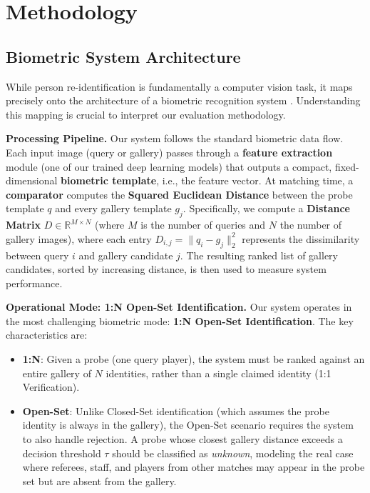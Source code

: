 \documentclass[10pt,twocolumn,letterpaper]{article}
\begin{document}
\section{Methodology}

\subsection{Biometric System Architecture}

While person re-identification is fundamentally a computer vision task, it maps precisely onto the architecture of a biometric recognition system \cite{jain2004introduction}. Understanding this mapping is crucial to interpret our evaluation methodology.

\textbf{Processing Pipeline.} Our system follows the standard biometric data flow. Each input image (query or gallery) passes through a \textbf{feature extraction} module (one of our trained deep learning models) that outputs a compact, fixed-dimensional \textbf{biometric template}, i.e., the feature vector. At matching time, a \textbf{comparator} computes the \textbf{Squared Euclidean Distance} between the probe template $q$ and every gallery template $g_j$. Specifically, we compute a \textbf{Distance Matrix} $D \in \mathbb{R}^{M \times N}$ (where $M$ is the number of queries and $N$ the number of gallery images), where each entry $D_{i,j} = \|q_i - g_j\|_2^2$ represents the dissimilarity between query $i$ and gallery candidate $j$. The resulting ranked list of gallery candidates, sorted by increasing distance, is then used to measure system performance.

\textbf{Operational Mode: 1:N Open-Set Identification.} Our system operates in the most challenging biometric mode: \textbf{1:N Open-Set Identification}. The key characteristics are:
\begin{itemize}
    \item \textbf{1:N}: Given a probe (one query player), the system must be ranked against an entire gallery of $N$ identities, rather than a single claimed identity (1:1 Verification).
    \item \textbf{Open-Set}: Unlike Closed-Set identification (which assumes the probe identity is always in the gallery), the Open-Set scenario requires the system to also handle rejection. A probe whose closest gallery distance exceeds a decision threshold $\tau$ should be classified as \textit{unknown}, modeling the real case where referees, staff, and players from other matches may appear in the probe set but are absent from the gallery.
\end{itemize}
\end{document}
